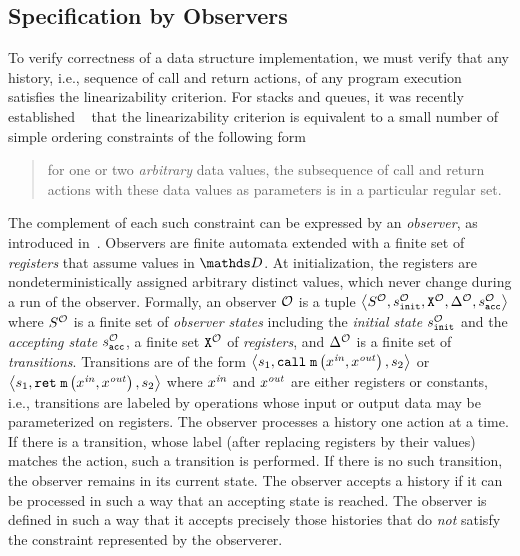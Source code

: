 \subsection{Specification by Observers}
To verify correctness of a data structure implementation,
we must verify that any history, i.e., sequence of call and return actions,
of any program execution satisfies the linearizability criterion.
For stacks and queues, it was recently established
~\cite{BEEH:icalp15,HSV:concur13} that the linearizability criterion is equivalent to
a small number of simple ordering constraints of the following form
\begin{quote}
for one or two {\em arbitrary} data values, the subsequence of
call and return actions with these data values as parameters is in 
a particular regular set.
\end{quote}
The complement of each such constraint can be
expressed by an {\em observer}, as introduced in~\cite{AHHR:integrated}. 
%
Observers are
finite automata extended with a finite set of {\em registers}
that assume values in $\ddomain$. 
%
%
At initialization,
the registers are nondeterministically
assigned arbitrary distinct values, which never change
during a run of the observer. 
%
Formally, an observer ${\mathcal O}$ is a tuple
$\left\langle S^{\mathcal O},s^{\mathcal O}_{\tt init},{\tt X}^{{\mathcal O}},\Delta^{\mathcal O},s^{\mathcal O}_{\tt acc}\right\rangle$ where $S^{\mathcal O}$ is a finite set 
of {\it observer states} including the 
{\it initial state} $s^{\mathcal O}_{\tt init}$ and
the {\it accepting state} $s^{\mathcal O}_{\tt acc}$, 
a finite set ${\tt X}^{{\mathcal O}}$  
of {\it registers}, and $\Delta^{\mathcal O}$ is a finite
set of {\it transitions}.
%
%
Transitions are of the form 
$\left\langle s_1,\mathtt{call}\; {\tt m}\left(x^{\it in},x^{\it out}\right),s_2\right\rangle$ or
$\left\langle s_1,\mathtt{ret}\; {\tt m}\left(x^{\it in},x^{\it out}\right),s_2\right\rangle$
where $x^{\it in}$ and $x^{\it out}$ are either registers or constants, i.e.,
transitions are labeled by 
operations whose input or output data may be parameterized on registers.
The observer processes a history one action at a time.
%
If there is a transition, whose label (after replacing registers by their
values) matches the action, such a transition is performed. 
%
If there is no
such transition, the observer remains in its current state.
The observer accepts a history if it can  be processed in such a way that
an accepting state is reached.
%
The observer is defined in such a way that it accepts precisely those
histories that do {\em not} satisfy the constraint represented by the observerer.
%


